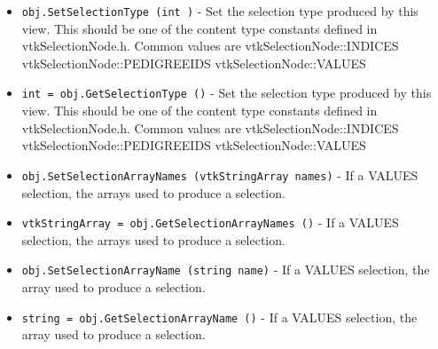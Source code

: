\begin{itemize}
\item  \verb|obj.SetSelectionType (int )| -  Set the selection type produced by this view.
 This should be one of the content type constants defined in
 vtkSelectionNode.h. Common values are
 vtkSelectionNode::INDICES
 vtkSelectionNode::PEDIGREEIDS
 vtkSelectionNode::VALUES

\item  \verb|int = obj.GetSelectionType ()| -  Set the selection type produced by this view.
 This should be one of the content type constants defined in
 vtkSelectionNode.h. Common values are
 vtkSelectionNode::INDICES
 vtkSelectionNode::PEDIGREEIDS
 vtkSelectionNode::VALUES

\item  \verb|obj.SetSelectionArrayNames (vtkStringArray names)| -  If a VALUES selection, the arrays used to produce a selection.

\item  \verb|vtkStringArray = obj.GetSelectionArrayNames ()| -  If a VALUES selection, the arrays used to produce a selection.

\item  \verb|obj.SetSelectionArrayName (string name)| -  If a VALUES selection, the array used to produce a selection.

\item  \verb|string = obj.GetSelectionArrayName ()| -  If a VALUES selection, the array used to produce a selection.

\end{itemize}

